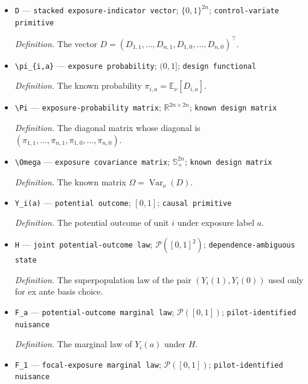 \documentclass{article}
\begin{document}
\begin{itemize}
  \par\smallskip\noindent\emph{Definition.} The indicator \(D_{i,a}=\mathbf 1\{f_i(W)=a\}\).
  \item \texttt{D} --- \texttt{stacked exposure-\allowbreak{}indicator vector}; \(\{0,1\}^{2n}\); \texttt{control-\allowbreak{}variate primitive}
  \par\smallskip\noindent\emph{Definition.} The vector \(D=(D_{1,1},\ldots,D_{n,1},D_{1,0},\ldots,D_{n,0})^{\top}\).
  \item \texttt{\textbackslash{}\allowbreak{}pi\_\allowbreak{}\{i,\allowbreak{}a\}\allowbreak{}} --- \texttt{exposure probability}; \((0,1]\); \texttt{design functional}
  \par\smallskip\noindent\emph{Definition.} The known probability \(\pi_{i,a}=\mathbb E_{\nu}[D_{i,a}]\).
  \item \texttt{\textbackslash{}\allowbreak{}Pi} --- \texttt{exposure-\allowbreak{}probability matrix}; \(\mathbb R^{2n\times 2n}\); \texttt{known design matrix}
  \par\smallskip\noindent\emph{Definition.} The diagonal matrix whose diagonal is \((\pi_{1,1},\ldots,\pi_{n,1},\pi_{1,0},\ldots,\pi_{n,0})\).
  \item \texttt{\textbackslash{}\allowbreak{}Omega} --- \texttt{exposure covariance matrix}; \(\mathbb S_+^{2n}\); \texttt{known design matrix}
  \par\smallskip\noindent\emph{Definition.} The known matrix \(\Omega=\operatorname{Var}_{\nu}(D)\).
  \item \texttt{Y\_\allowbreak{}i(a)} --- \texttt{potential outcome}; \([0,1]\); \texttt{causal primitive}
  \par\smallskip\noindent\emph{Definition.} The potential outcome of unit \(i\) under exposure label \(a\).
  \item \texttt{H} --- \texttt{joint potential-\allowbreak{}outcome law}; \(\mathcal P([0,1]^2)\); \texttt{dependence-\allowbreak{}ambiguous state}
  \par\smallskip\noindent\emph{Definition.} The superpopulation law of the pair \((Y_i(1),Y_i(0))\) used only for ex ante basis choice.
  \item \texttt{F\_\allowbreak{}a} --- \texttt{potential-\allowbreak{}outcome marginal law}; \(\mathcal P([0,1])\); \texttt{pilot-\allowbreak{}identified nuisance}
  \par\smallskip\noindent\emph{Definition.} The marginal law of \(Y_i(a)\) under \(H\).
  \item \texttt{F\_\allowbreak{}1} --- \texttt{focal-\allowbreak{}exposure marginal law}; \(\mathcal P([0,1])\); \texttt{pilot-\allowbreak{}identified nuisance}

\end{itemize}
\end{document}

